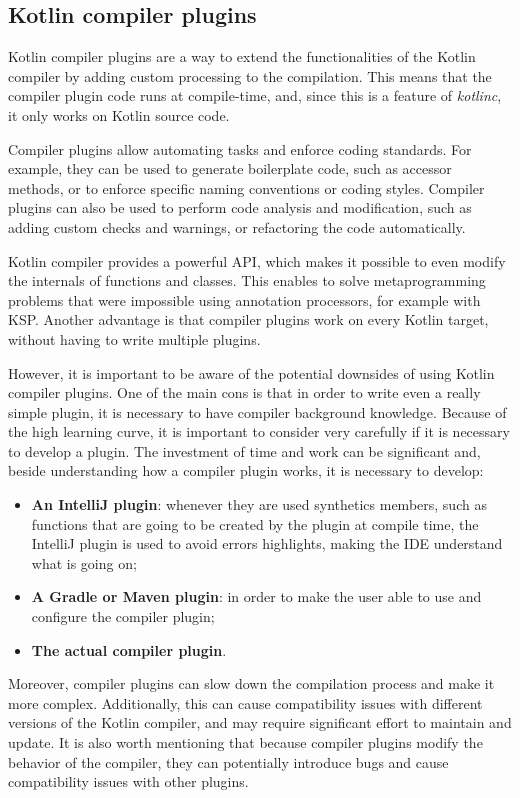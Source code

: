 \subsection{Kotlin compiler plugins}\label{section:compiler_plugin_explanation}
Kotlin compiler plugins \cite{compiler_plugins_jetbrains} are a way to extend the functionalities of the Kotlin compiler by adding custom processing to the compilation. This means that the compiler plugin code runs at compile-time, and, since this is a feature of \textit{kotlinc}, it only works on Kotlin source code.

Compiler plugins allow automating tasks and enforce coding standards. For example, they can be used to generate boilerplate code, such as accessor methods, or to enforce specific naming conventions or coding styles. Compiler plugins can also be used to perform code analysis and modification, such as adding custom checks and warnings, or refactoring the code automatically.

Kotlin compiler provides a powerful API, which makes it possible to even modify the internals of functions and classes. This enables to solve metaprogramming problems that were impossible using annotation processors, for example with KSP. Another advantage is that compiler plugins work on every Kotlin target, without having to write multiple plugins.

However, it is important to be aware of the potential downsides of using Kotlin compiler plugins. One of the main cons is that in order to write even a really simple plugin, it is necessary to have compiler background knowledge. Because of the high learning curve, it is important to consider very carefully if it is necessary to develop a plugin. The investment of time and work can be significant and, beside understanding how a compiler plugin works, it is necessary to develop:
\begin{itemize}
    \item \textbf{An IntelliJ plugin}: whenever they are used synthetics members, such as functions that are going to be created by the plugin at compile time, the IntelliJ plugin is used to avoid errors highlights, making the IDE understand what is going on;
    \item \textbf{A Gradle or Maven plugin}: in order to make the user able to use and configure the compiler plugin;
    \item \textbf{The actual compiler plugin}.
\end{itemize}

Moreover, compiler plugins can slow down the compilation process and make it more complex. Additionally, this can cause compatibility issues with different versions of the Kotlin compiler, and may require significant effort to maintain and update. It is also worth mentioning that because compiler plugins modify the behavior of the compiler, they can potentially introduce bugs and cause compatibility issues with other plugins.

